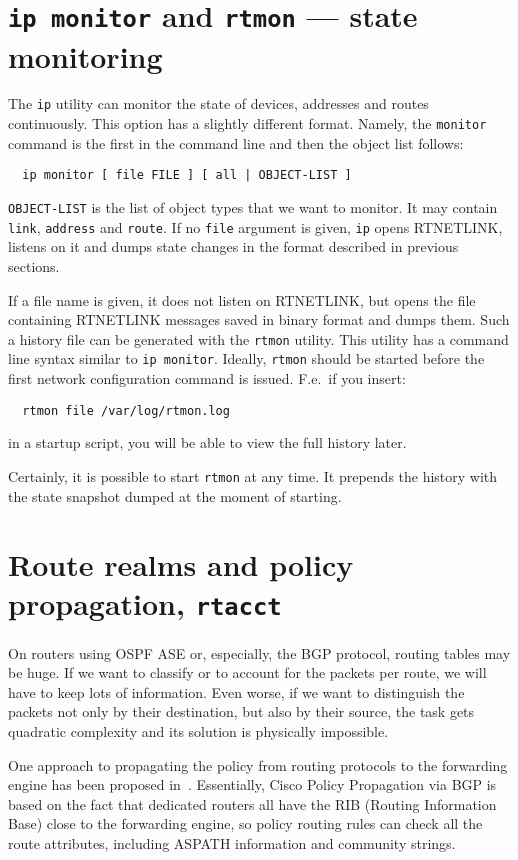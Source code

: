 \section{{\tt ip monitor} and {\tt rtmon} --- state monitoring}
\label{IP-MONITOR}

The \verb|ip| utility can monitor the state of devices, addresses
and routes continuously. This option has a slightly different format.
Namely,
the \verb|monitor| command is the first in the command line and then
the object list follows:
\begin{verbatim}
  ip monitor [ file FILE ] [ all | OBJECT-LIST ]
\end{verbatim}
\verb|OBJECT-LIST| is the list of object types that we want to monitor.
It may contain \verb|link|, \verb|address| and \verb|route|.
If no \verb|file| argument is given, \verb|ip| opens RTNETLINK,
listens on it and dumps state changes in the format described
in previous sections.

If a file name is given, it does not listen on RTNETLINK,
but opens the file containing RTNETLINK messages saved in binary format
and dumps them. Such a history file can be generated with the
\verb|rtmon| utility. This utility has a command line syntax similar to
\verb|ip monitor|.
Ideally, \verb|rtmon| should be started before
the first network configuration command is issued. F.e.\ if
you insert:
\begin{verbatim}
  rtmon file /var/log/rtmon.log
\end{verbatim}
in a startup script, you will be able to view the full history
later.

Certainly, it is possible to start \verb|rtmon| at any time.
It prepends the history with the state snapshot dumped at the moment
of starting.


\section{Route realms and policy propagation, {\tt rtacct}}
\label{RT-REALMS}

On routers using OSPF ASE or, especially, the BGP protocol, routing
tables may be huge. If we want to classify or to account for the packets
per route, we will have to keep lots of information. Even worse, if we
want to distinguish the packets not only by their destination, but
also by their source, the task gets quadratic complexity and its solution
is physically impossible.

One approach to propagating the policy from routing protocols
to the forwarding engine has been proposed in~\cite{IOS-BGP-PP}.
Essentially, Cisco Policy Propagation via BGP is based on the fact
that dedicated routers all have the RIB (Routing Information Base)
close to the forwarding engine, so policy routing rules can
check all the route attributes, including ASPATH information
and community strings.

